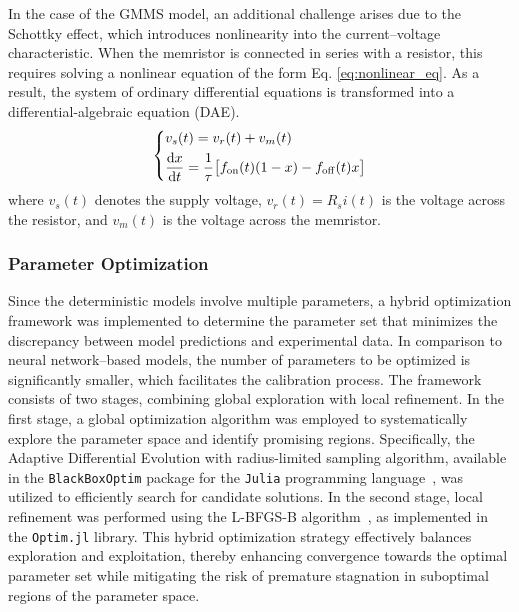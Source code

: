 \documentclass[lettersize,journal]{IEEEtran}
\newcommand{\dert}[1]{\frac{{\rm d} {#1}}{{\rm d} t} }
\begin{document}
In the case of the GMMS model, an additional challenge arises due to the Schottky effect, which introduces nonlinearity into the current–voltage characteristic. When the memristor is connected in series with a resistor, this requires solving a nonlinear equation of the form Eq. \eqref{eq:nonlinear_eq}. As a result, the system of ordinary differential equations is transformed into a differential-algebraic equation (DAE).
\begin{equation}
  \left\{
  \begin{aligned}
     & v_s(t)    = v_r(t) + v_m(t)                                                   \\
     & \dert{x}  = \frac{1}{\tau} \big[ f_{\rm on}(t) (1-x) - f_{\rm off}(t) x \big]
  \end{aligned}
  \right.
  \label{eq:nonlinear_eq}
\end{equation}
where \(v_s(t)\) denotes the supply voltage, \(v_r(t) = R_s i(t)\) is the voltage across the resistor, and \(v_m(t)\) is the voltage across the memristor.

\subsubsection{Parameter Optimization}
Since the deterministic models involve multiple parameters, a hybrid optimization framework was implemented to determine the parameter set that minimizes the discrepancy between model predictions and experimental data. In comparison to neural network--based models, the number of parameters to be optimized is significantly smaller, which facilitates the calibration process. The framework consists of two stages, combining global exploration with local refinement. In the first stage, a global optimization algorithm was employed to systematically explore the parameter space and identify promising regions. Specifically, the Adaptive Differential Evolution with radius-limited sampling algorithm, available in the \verb|BlackBoxOptim| package for the \texttt{Julia} programming language~\cite{BlackBoxOptim}, was utilized to efficiently search for candidate solutions. In the second stage, local refinement was performed using the L-BFGS-B algorithm~\cite{Zhu1997}, as implemented in the \texttt{Optim.jl} library. This hybrid optimization strategy effectively balances exploration and exploitation, thereby enhancing convergence towards the optimal parameter set while mitigating the risk of premature stagnation in suboptimal regions of the parameter space.
\end{document}
